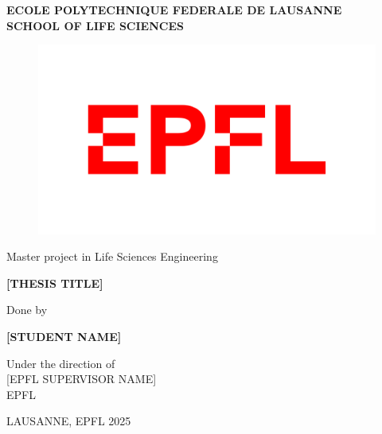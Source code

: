 \begin{titlepage}
    \centering
    \textbf{\large
    ECOLE POLYTECHNIQUE FEDERALE DE LAUSANNE\\
    SCHOOL OF LIFE SCIENCES
    }
    \vspace{0.5cm}

    \begin{figure}[h]
        \centering
        \includegraphics[width=0.5\linewidth]{figures/logo-epfl.png}
    \end{figure}

    {\Large
    Master project in Life Sciences Engineering
    }

    \vspace{2cm}

    \textbf{
    {\large [THESIS TITLE]
    }}

    \vspace{1.5cm}

    \vspace{2cm}
    Done by

    \vspace{0.5cm}
    \textbf{\Large [STUDENT NAME]}

    \vspace{1.5cm}
    Under the direction of\\ {}[EPFL SUPERVISOR NAME]\\

    \vspace{1cm}
    EPFL


    \vfill
    LAUSANNE, EPFL 2025
\end{titlepage}
